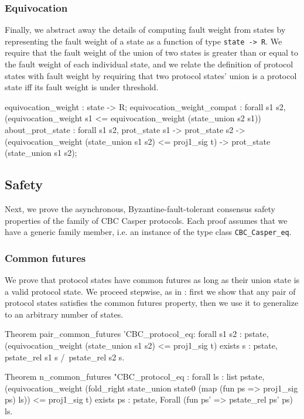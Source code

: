 \documentclass[runningheads]{llncs}
\begin{document}
\subsubsection{Equivocation} 
Finally, we abstract away the details of computing fault weight from states by representing the fault weight of a state as a function of type \verb|state -> R|. We require that the fault weight of the union of two states is greater than or equal to the fault weight of each individual state, and we relate the definition of protocol states with fault weight by requiring that two protocol states' union is a protocol state iff its fault weight is under threshold. 
\begin{coq}
	equivocation_weight : state -> R; 
	equivocation_weight_compat : forall s1 s2, 
	(equivocation_weight s1 <= equivocation_weight (state_union s2 s1))%
	about_prot_state : forall s1 s2, prot_state s1 -> prot_state s2 ->
										(equivocation_weight (state_union s1 s2) <= proj1_sig t)%
										-> prot_state (state_union s1 s2);
\end{coq}

\subsection{Safety} 
Next, we prove the asynchronous, Byzantine-fault-tolerant consensus safety properties of the family of CBC Casper protocols. Each proof assumes that we have a generic family member, i.e. an instance of the type class \verb|CBC_Casper_eq|. 
\subsubsection{Common futures} 
We prove that protocol states have common futures as long as their union state is a valid protocol state. We proceed stepwise, as in \cite{CBCfull}: first we show that any pair of protocol states satisfies the common futures property, then we use it to generalize to an arbitrary number of states. 
\begin{coq}
Theorem pair_common_futures '{CBC_protocol_eq}:
	forall s1 s2 : pstate,
	(equivocation_weight (state_union s1 s2) <= proj1_sig t)%
	exists s : pstate, pstate_rel s1 s /\ pstate_rel s2 s.
	
Theorem n_common_futures "{CBC_protocol_eq} :
forall ls : list pstate,
(equivocation_weight (fold_right state_union state0 (map (fun ps => proj1_sig ps) ls)) <= proj1_sig t)%
exists ps : pstate, Forall (fun ps' => pstate_rel ps' ps) ls.
\end{coq}	
\end{document}
